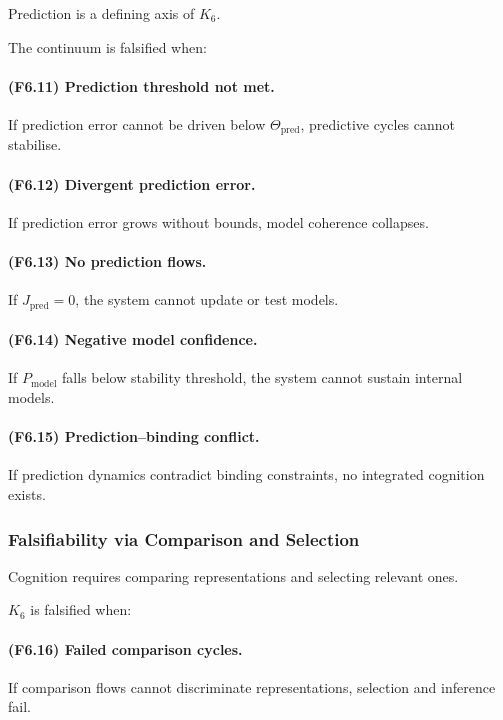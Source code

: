 Prediction is a defining axis of $K_6$.

The continuum is falsified when:

\paragraph{(F6.11) Prediction threshold not met.}
If prediction error cannot be driven below $\Theta_{\mathrm{pred}}$,
predictive cycles cannot stabilise.

\paragraph{(F6.12) Divergent prediction error.}
If prediction error grows without bounds,
model coherence collapses.

\paragraph{(F6.13) No prediction flows.}
If $J_{\mathrm{pred}}=0$, the system cannot update or test models.

\paragraph{(F6.14) Negative model confidence.}
If $P_{\mathrm{model}}$ falls below stability threshold,
the system cannot sustain internal models.

\paragraph{(F6.15) Prediction–binding conflict.}
If prediction dynamics contradict binding constraints,
no integrated cognition exists.



\subsubsection{Falsifiability via Comparison and Selection}

Cognition requires comparing representations and selecting relevant ones.

$K_6$ is falsified when:

\paragraph{(F6.16) Failed comparison cycles.}
If comparison flows cannot discriminate representations,
selection and inference fail.

